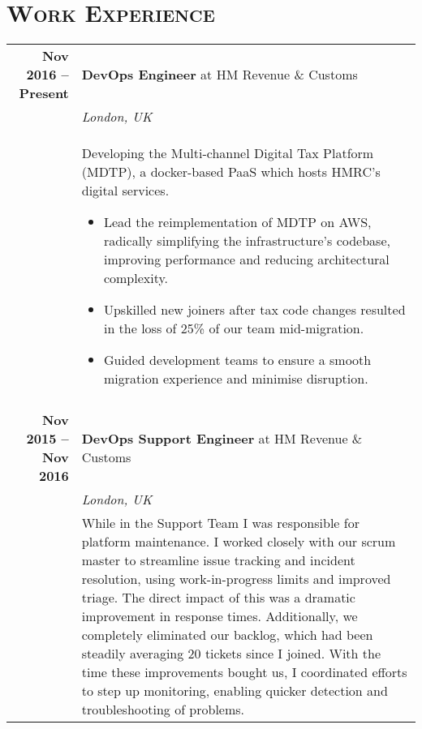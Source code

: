 \documentclass[a4paper,10pt]{article} %
\begin{document}
\section{\textsc{Work Experience}}
\centering
\begin{tabularx}{\textwidth}{r|X}
\textbf{Nov 2016 -- Present}        & \textbf{DevOps Engineer} at HM Revenue \& Customs \\
                                    & \emph{London, UK} \\
                                    & \footnotesize
    {Developing the Multi-channel Digital Tax Platform (MDTP), a docker-based PaaS which
    hosts HMRC's digital services.
    \begin{itemize}
    \item Lead the reimplementation of MDTP on AWS, radically simplifying the infrastructure's codebase, improving performance and reducing architectural complexity.
    \item Upskilled new joiners after tax code changes resulted in the loss of 25\% of our team mid-migration.
    \item Guided development teams to ensure a smooth migration experience and minimise disruption.
    \end{itemize}
    }\\

\multicolumn{2}{r}{} \\ %

\textbf{Nov 2015 -- Nov 2016}       & \textbf{DevOps Support Engineer} at HM Revenue \& Customs \\
                                    & \emph{London, UK} \\
                                    & \footnotesize{While in the Support
                                    Team I was responsible for platform
                                    maintenance. I worked closely with our scrum
                                    master to streamline issue tracking and
                                    incident resolution, using work-in-progress
                                    limits and improved triage.  The direct
                                    impact of this was a dramatic improvement in
                                    response times. Additionally, we completely
                                    eliminated our backlog, which had been
                                    steadily averaging 20 tickets since I
                                    joined. With the time these improvements
                                    bought us, I coordinated efforts to step up
                                    monitoring, enabling quicker detection and
                                    troubleshooting of problems.}\\


\end{tabularx}
\end{document}
